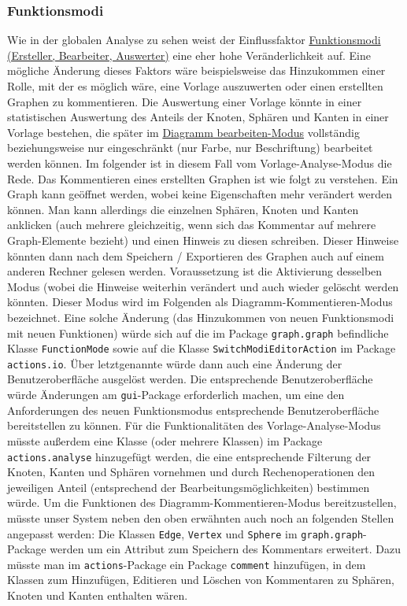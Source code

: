 \documentclass[enabledeprecatedfontcommands,fontsize=11pt,paper=a4,twoside]{scrartcl}
\newcounter{one}
\begin{document}
\subsubsection{Funktionsmodi}
Wie in der globalen Analyse zu sehen weist der Einflussfaktor \hyperlink{z}{Funktionsmodi (Ersteller, Bearbeiter, Auswerter)} eine eher hohe Veränderlichkeit auf. Eine mögliche Änderung dieses Faktors wäre beispielsweise das Hinzukommen einer Rolle, mit der es möglich wäre, eine Vorlage auszuwerten oder einen erstellten Graphen zu kommentieren.
Die Auswertung einer Vorlage könnte in einer statistischen Auswertung des Anteils der Knoten, Sphären und Kanten in einer Vorlage bestehen, die später im \hyperlink{''Diagramm bearbeiten''-Modus}{\glqq Diagramm bearbeiten\grqq-Modus} vollständig beziehungsweise nur eingeschränkt (nur Farbe, nur Beschriftung) bearbeitet werden können. Im folgender ist in diesem Fall vom Vorlage-Analyse-Modus die Rede.
Das Kommentieren eines erstellten Graphen ist wie folgt zu verstehen. Ein Graph kann geöffnet werden, wobei keine Eigenschaften mehr verändert werden können. Man kann allerdings die einzelnen Sphären, Knoten und Kanten anklicken (auch mehrere gleichzeitig, wenn sich das Kommentar auf mehrere Graph-Elemente bezieht) und einen Hinweis zu diesen schreiben. Dieser Hinweise könnten dann nach dem Speichern / Exportieren des Graphen auch auf einem anderen Rechner gelesen werden. Voraussetzung ist die Aktivierung desselben Modus (wobei die Hinweise weiterhin verändert und auch wieder gelöscht werden könnten. Dieser Modus wird im Folgenden als Diagramm-Kommentieren-Modus bezeichnet.
Eine solche Änderung (das Hinzukommen von neuen Funktionsmodi mit neuen Funktionen) würde sich auf die im Package \texttt{graph.graph} befindliche Klasse \texttt{FunctionMode} sowie auf die Klasse \texttt{SwitchModiEditorAction} im Package \texttt{actions.io}. Über letztgenannte würde dann auch eine Änderung der Benutzeroberfläche ausgelöst werden. Die entsprechende Benutzeroberfläche würde Änderungen am \texttt{gui}-Package erforderlich machen, um eine den Anforderungen des neuen Funktionsmodus entsprechende Benutzeroberfläche bereitstellen zu können.
Für die Funktionalitäten des Vorlage-Analyse-Modus müsste außerdem eine Klasse (oder mehrere Klassen) im Package \texttt{actions.analyse} hinzugefügt werden, die eine entsprechende Filterung der Knoten, Kanten und Sphären vornehmen und durch Rechenoperationen den jeweiligen Anteil (entsprechend der Bearbeitungsmöglichkeiten) bestimmen würde.
Um die Funktionen des Diagramm-Kommentieren-Modus bereitzustellen, müsste unser System neben den oben erwähnten auch noch an folgenden Stellen angepasst werden: Die Klassen \texttt{Edge}, \texttt{Vertex} und \texttt{Sphere} im \texttt{graph.graph}-Package werden um ein Attribut zum Speichern des Kommentars erweitert. Dazu müsste man im \texttt{actions}-Package ein Package \texttt{comment} hinzufügen, in dem Klassen zum Hinzufügen, Editieren und Löschen von Kommentaren zu Sphären, Knoten und Kanten enthalten wären. \\
 
\end{document}
